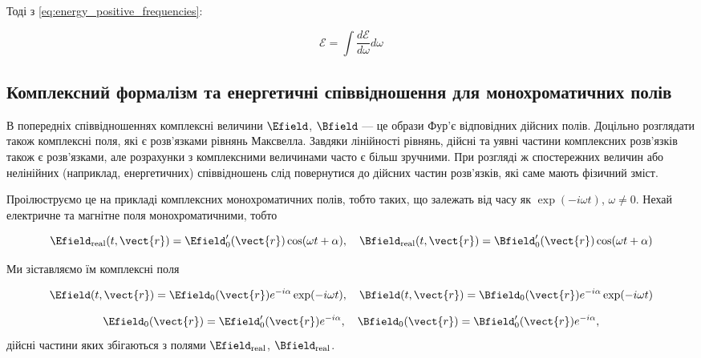 Тоді з \eqref{eq:energy_positive_frequencies}:

\begin{equation}
\mathcal{E} = \int \frac{d\mathcal{E}}{d\omega} d\omega
\label{eq:total_energy_integral}
\end{equation}

\subsection*{Комплексний формалізм та енергетичні співвідношення для монохроматичних полів}

В попередніх співвідношеннях комплексні величини \(\Efield\), \(\Bfield\) --- це образи Фур’є відповідних дійсних полів. Доцільно розглядати також
комплексні поля, які є розв’язками рівнянь Максвелла. Завдяки лінійності рівнянь, дійсні та уявні частини комплексних розв’язків також є розв’язками,
але розрахунки з комплексними величинами часто є більш зручними. При розгляді ж спостережних величин або нелінійних (наприклад, енергетичних)
співвідношень слід повернутися до дійсних частин розв’язків, які саме мають фізичний зміст.

Проілюструємо це на прикладі комплексних монохроматичних полів, тобто таких, що залежать від часу як \(\exp(-i\omega t)\), \(\omega \neq 0\). Нехай
електричне та магнітне поля монохроматичними, тобто

\begin{equation}
\Efield_{\text{real}}(t, \vect{r}) = \Efield'_0(\vect{r}) \cos(\omega t + \alpha), \quad \Bfield_{\text{real}}(t, \vect{r}) = \Bfield'_0(\vect{r})
\cos(\omega t + \alpha)
\label{eq:real_fields}
\end{equation}

Ми зіставляємо їм комплексні поля

\begin{equation}
\Efield(t, \vect{r}) = \Efield_0(\vect{r}) e^{-i\alpha} \exp(-i\omega t), \quad \Bfield(t, \vect{r}) = \Bfield_0(\vect{r}) e^{-i\alpha}
\exp(-i\omega t)
\label{eq:complex_fields}
\end{equation}

\begin{equation*}
\Efield_0(\vect{r}) = \Efield'_0(\vect{r}) e^{-i\alpha}, \quad \Bfield_0(\vect{r}) = \Bfield'_0(\vect{r}) e^{-i\alpha},
\end{equation*}
дійсні частини яких збігаються з полями \(\Efield_{\text{real}}\), \(\Bfield_{\text{real}}\).

